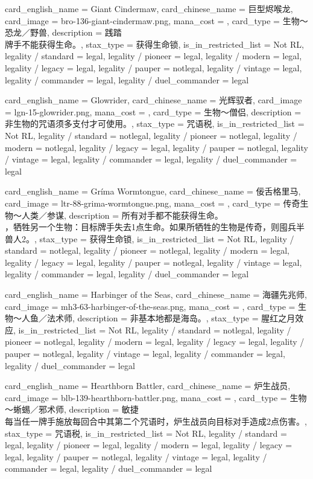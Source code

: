 \documentclass[lang = cn, color = black, 10pt]{AllThatStax}
\begin{document}
\card
{
	card_english_name = {Giant Cindermaw},
	card_chinese_name = {巨型烬喉龙},
	card_image = bro-136-giant-cindermaw.png,
	mana_cost = ,
	card_type = 生物～恐龙／野兽,
	description = {践踏\\
牌手不能获得生命。},
	stax_type = 获得生命锁,
	is_in_restricted_list = Not RL,
	legality / standard = legal,
	legality / pioneer = legal,
	legality / modern = legal,
	legality / legacy = legal,
	legality / pauper = notlegal,
	legality / vintage = legal,
	legality / commander = legal,
	legality / duel_commander = legal
}

\card
{
	card_english_name = {Glowrider},
	card_chinese_name = {光辉驭者},
	card_image = lgn-15-glowrider.png,
	mana_cost = ,
	card_type = 生物～僧侣,
	description = {非生物的咒语须多支付才可使用。},
	stax_type = 咒语税,
	is_in_restricted_list = Not RL,
	legality / standard = notlegal,
	legality / pioneer = notlegal,
	legality / modern = notlegal,
	legality / legacy = legal,
	legality / pauper = notlegal,
	legality / vintage = legal,
	legality / commander = legal,
	legality / duel_commander = legal
}

\card
{
	card_english_name = {Gríma Wormtongue},
	card_chinese_name = {佞舌格里马},
	card_image = ltr-88-grima-wormtongue.png,
	mana_cost = ,
	card_type = 传奇生物～人类／参谋,
	description = {所有对手都不能获得生命。\\
，牺牲另一个生物：目标牌手失去1点生命。如果所牺牲的生物是传奇，则囤兵半兽人2。},
	stax_type = 获得生命锁,
	is_in_restricted_list = Not RL,
	legality / standard = notlegal,
	legality / pioneer = notlegal,
	legality / modern = legal,
	legality / legacy = legal,
	legality / pauper = notlegal,
	legality / vintage = legal,
	legality / commander = legal,
	legality / duel_commander = legal
}

\card
{
	card_english_name = {Harbinger of the Seas},
	card_chinese_name = {海疆先兆师},
	card_image = mh3-63-harbinger-of-the-seas.png,
	mana_cost = ,
	card_type = 生物～人鱼／法术师,
	description = {非基本地都是海岛。},
	stax_type = 腥红之月效应,
	is_in_restricted_list = Not RL,
	legality / standard = notlegal,
	legality / pioneer = notlegal,
	legality / modern = legal,
	legality / legacy = legal,
	legality / pauper = notlegal,
	legality / vintage = legal,
	legality / commander = legal,
	legality / duel_commander = legal
}

\card
{
	card_english_name = {Hearthborn Battler},
	card_chinese_name = {炉生战员},
	card_image = blb-139-hearthborn-battler.png,
	mana_cost = ,
	card_type = 生物～蜥蜴／邪术师,
	description = {敏捷\\
每当任一牌手施放每回合中其第二个咒语时，炉生战员向目标对手造成2点伤害。},
	stax_type = 咒语税,
	is_in_restricted_list = Not RL,
	legality / standard = legal,
	legality / pioneer = legal,
	legality / modern = legal,
	legality / legacy = legal,
	legality / pauper = notlegal,
	legality / vintage = legal,
	legality / commander = legal,
	legality / duel_commander = legal
}
\end{document}
